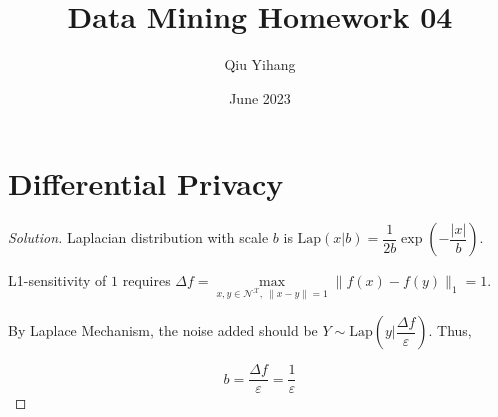 \documentclass{article}
\title{\textbf{Data Mining Homework 04}}
\author{Qiu Yihang}
\date{June 2023}
\newenvironment{solution}{\begin{proof}[\noindent\it Solution]}{\end{proof}}
\begin{document}
\maketitle

\vspace{1em}
\section{Differential Privacy}
\vspace{0.5em}
\begin{solution}
    Laplacian distribution with scale $b$ is $\mathrm{Lap}(x|b) = \dfrac{1}{2b}\exp\left(-\dfrac{|x|}{b}\right)$.

    \vspace{0.5em} \hspace{2.6em}
    L1-sensitivity of $1$ requires $\Delta f = \underset{x,y\in\mathcal{N}^{\mathcal{X}},\ \|x-y\|=1}{\max} \|f(x)-f(y)\|_1 = 1.$

    \hspace{2.6em}
    By Laplace Mechanism, the noise added should be $Y\sim\mathrm{Lap}\left(y|\dfrac{\Delta f}{\varepsilon}\right)$. Thus, 
    
    \[ b = \dfrac{\Delta f}{\varepsilon} = \dfrac{1}{\varepsilon}\]

\vspace{-2.5em}
\end{solution}

\vspace{0.5em}
\end{document}
